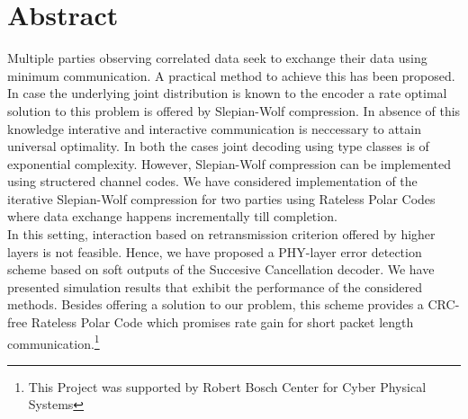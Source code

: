 \documentclass[
11pt, %
a4paper, %
oneside, %
headinclude,footinclude, %
BCOR5mm, %
]{scrartcl}
\begin{document}
\newpage


\setcounter{tocdepth}{2} %

\tableofcontents %
\newpage
\listoffigures

\newpage
\section*{Abstract}
Multiple parties observing correlated data seek to exchange their data using minimum communication. A practical method to achieve this has been proposed. \\In case the underlying joint distribution is known to the encoder a rate optimal solution to this problem is offered by Slepian-Wolf compression. In absence of this knowledge interative and interactive communication is neccessary to attain universal optimality. In both the cases joint decoding using type classes is of exponential complexity. However, Slepian-Wolf compression can be implemented using structered channel codes. We have considered implementation of the iterative Slepian-Wolf compression for two parties using Rateless Polar Codes where data exchange happens incrementally till completion. \\In this setting, interaction based on retransmission criterion offered by higher layers is not feasible.
Hence, we have  proposed a PHY-layer error detection scheme based on soft outputs of the Succesive Cancellation decoder. We have presented simulation results that exhibit the performance of the considered methods.
Besides offering a solution to our problem, this scheme provides a CRC-free Rateless Polar Code which promises rate gain for short packet length communication.\footnote{This Project was supported by Robert Bosch Center for Cyber Physical Systems}
 
\newpage
\end{document}
